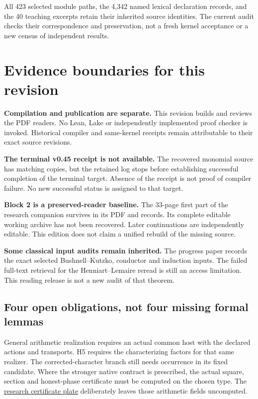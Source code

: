 All 423 selected module paths, the 4,342 named lexical declaration records, and the 40 teaching excerpts retain their inherited source identities. The current audit checks their correspondence and preservation, not a fresh kernel acceptance or a new census of independent results.
\clearpage
\section*{Evidence boundaries for this revision}
{}
\textbf{Compilation and publication are separate.} This revision builds and reviews the PDF readers. No Lean, Lake or independently implemented proof checker is invoked. Historical compiler and same-kernel receipts remain attributable to their exact source revisions.

\textbf{The terminal v0.45 receipt is not available.} The recovered monomial source has matching copies, but the retained log stops before establishing successful completion of the terminal target. Absence of the receipt is not proof of compiler failure. No new successful status is assigned to that target.

\textbf{Block 2 is a preserved-reader baseline.} The 33-page first part of the research companion survives in its PDF and records. Its complete editable working archive has not been recovered. Later continuations are independently editable. This edition does not claim a unified rebuild of the missing source.

\textbf{Some classical input audits remain inherited.} The progress paper records the exact selected Bushnell--Kutzko, conductor and induction inputs. The failed full-text retrieval for the Henniart--Lemaire reread is still an access limitation. This reading release is not a new audit of that theorem.

\subsection*{Four open obligations, not four missing formal lemmas}
General arithmetic realization requires an actual common host with the declared actions and transports. H5 requires the characterizing factors for that same realizer. The corrected-character branch still needs occurrence in its fixed candidate. Where the stronger native contract is prescribed, the actual square, section and honest-phase certificate must be computed on the chosen type. The \href{https://komorebi.invalid/b07/lean_native}{research certificate plate} deliberately leaves those arithmetic fields uncomputed.

